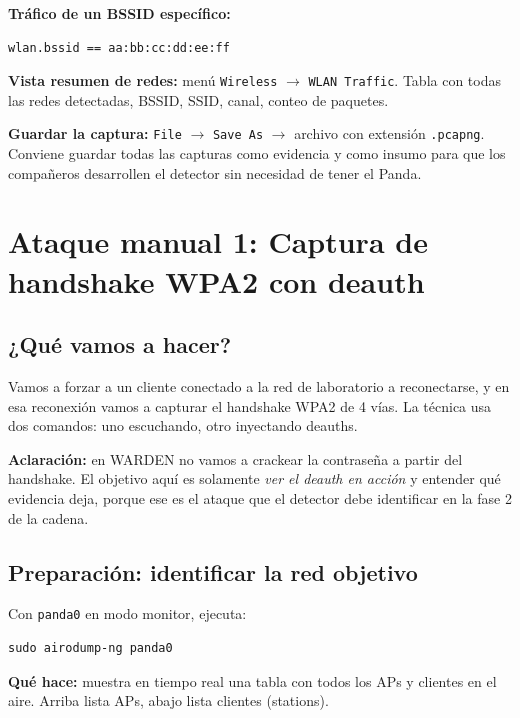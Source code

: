 \documentclass[11pt,a4paper]{article}
\begin{document}
\textbf{Tráfico de un BSSID específico:}

\begin{lstlisting}
wlan.bssid == aa:bb:cc:dd:ee:ff
\end{lstlisting}

\textbf{Vista resumen de redes:} menú \texttt{Wireless} $\rightarrow$
\texttt{WLAN Traffic}. Tabla con todas las redes detectadas, BSSID, SSID,
canal, conteo de paquetes.

\textbf{Guardar la captura:} \texttt{File} $\rightarrow$ \texttt{Save As}
$\rightarrow$ archivo con extensión \texttt{.pcapng}. Conviene guardar
todas las capturas como evidencia y como insumo para que los compañeros
desarrollen el detector sin necesidad de tener el Panda.

\section{Ataque manual 1: Captura de handshake WPA2 con deauth}

\subsection{¿Qué vamos a hacer?}
Vamos a forzar a un cliente conectado a la red de laboratorio a
reconectarse, y en esa reconexión vamos a capturar el handshake WPA2 de 4
vías. La técnica usa dos comandos: uno escuchando, otro inyectando
deauths.

\textbf{Aclaración:} en WARDEN no vamos a crackear la contraseña a partir
del handshake. El objetivo aquí es solamente \emph{ver el deauth en
acción} y entender qué evidencia deja, porque ese es el ataque que el
detector debe identificar en la fase 2 de la cadena.

\subsection{Preparación: identificar la red objetivo}
Con \texttt{panda0} en modo monitor, ejecuta:

\begin{lstlisting}
sudo airodump-ng panda0
\end{lstlisting}

\textbf{Qué hace:} muestra en tiempo real una tabla con todos los APs y
clientes en el aire. Arriba lista APs, abajo lista clientes (stations).
\end{document}
